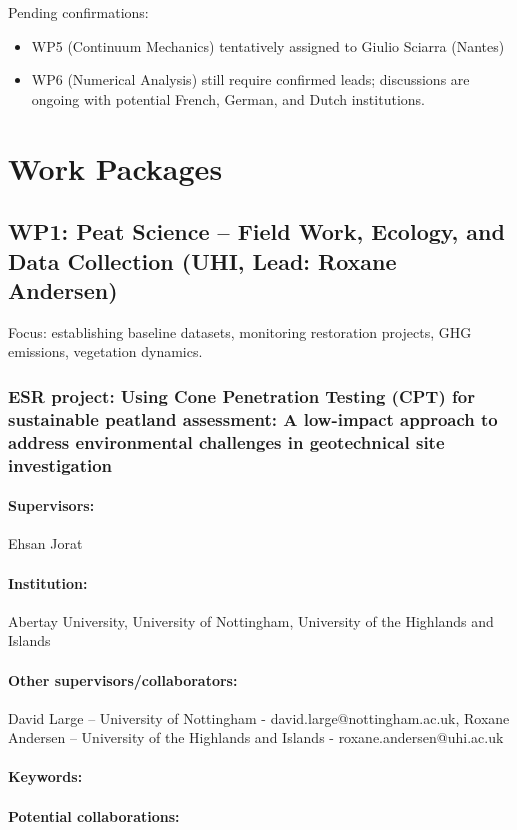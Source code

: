\documentclass[12pt]{article}
\begin{document}
Pending confirmations:
\begin{itemize}
    \item WP5 (Continuum Mechanics) tentatively assigned to Giulio Sciarra (Nantes)
    \item WP6 (Numerical Analysis) still require confirmed leads; discussions are ongoing with potential French, German, and Dutch institutions.
\end{itemize}

\section{Work Packages}


\subsection{WP1: Peat Science – Field Work, Ecology, and Data Collection (UHI, Lead: Roxane Andersen)}

Focus: establishing baseline datasets, monitoring restoration projects, GHG emissions, vegetation dynamics.

\subsubsection*{ESR project: Using Cone Penetration Testing (CPT) for sustainable peatland assessment: A low-impact approach to address environmental challenges in geotechnical site investigation}
\paragraph{Supervisors:} Ehsan Jorat
\paragraph{Institution:} Abertay University, University of Nottingham, University of the Highlands and Islands
\paragraph{Other supervisors/collaborators:} David Large – University of Nottingham - david.large@nottingham.ac.uk,   Roxane Andersen – University of the Highlands and Islands - roxane.andersen@uhi.ac.uk 
\paragraph{Keywords:} 
\paragraph{Potential collaborations:} 
\end{document}
